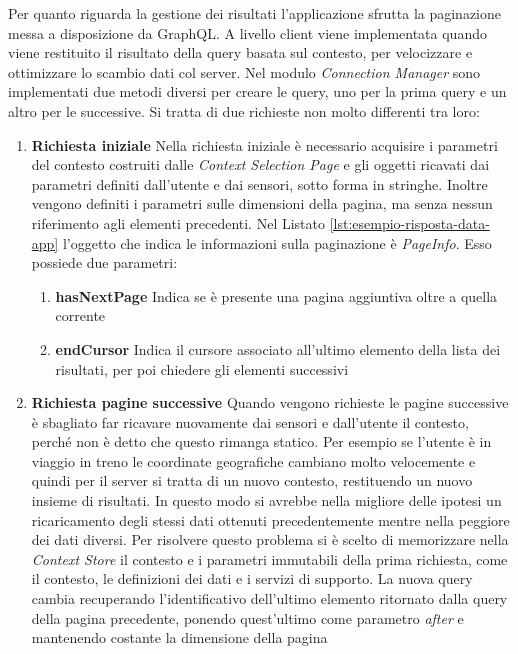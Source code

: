 Per quanto riguarda la gestione dei risultati l'applicazione sfrutta la paginazione messa a disposizione da GraphQL. A livello client viene implementata quando viene restituito il risultato della query basata sul contesto, per velocizzare e ottimizzare lo scambio dati col server. Nel modulo \emph{Connection Manager} sono implementati due metodi diversi per creare le query, uno per la prima query e un altro per le successive. Si tratta di due richieste non molto differenti tra loro:
\begin{enumerate}
	\item \textbf{Richiesta iniziale} Nella richiesta iniziale è necessario acquisire i parametri del contesto costruiti dalle \emph{Context Selection Page} e gli oggetti ricavati dai parametri definiti dall'utente e dai sensori, sotto forma in stringhe. Inoltre vengono definiti i parametri sulle dimensioni della pagina, ma senza nessun riferimento agli elementi precedenti.
	Nel Listato \ref{lst:esempio-risposta-data-app} l'oggetto che indica le informazioni sulla paginazione è \emph{PageInfo}. Esso possiede due parametri:
	\begin{enumerate}
		\item \textbf{hasNextPage} Indica se è presente una pagina aggiuntiva oltre a quella corrente
		\item \textbf{endCursor} Indica il cursore associato all'ultimo elemento della lista dei risultati, per poi chiedere gli elementi successivi
	\end{enumerate}
	\item \textbf{Richiesta pagine successive} Quando vengono richieste le pagine successive è sbagliato far ricavare nuovamente dai sensori e dall'utente il contesto, perché non è detto che questo rimanga statico. Per esempio se l'utente è in viaggio in treno le coordinate geografiche cambiano molto velocemente e quindi per il server si tratta di un nuovo contesto, restituendo un nuovo insieme di risultati. In questo modo si avrebbe nella migliore delle ipotesi un ricaricamento degli stessi dati ottenuti precedentemente mentre nella peggiore dei dati diversi. Per risolvere questo problema si è scelto di memorizzare nella \emph{Context Store} il contesto e i parametri immutabili della prima richiesta, come il contesto, le definizioni dei dati e i servizi di supporto. La nuova query cambia recuperando l'identificativo dell'ultimo elemento ritornato dalla query della pagina precedente, ponendo quest'ultimo come parametro \emph{after} e mantenendo costante la dimensione della pagina
\end{enumerate} 

